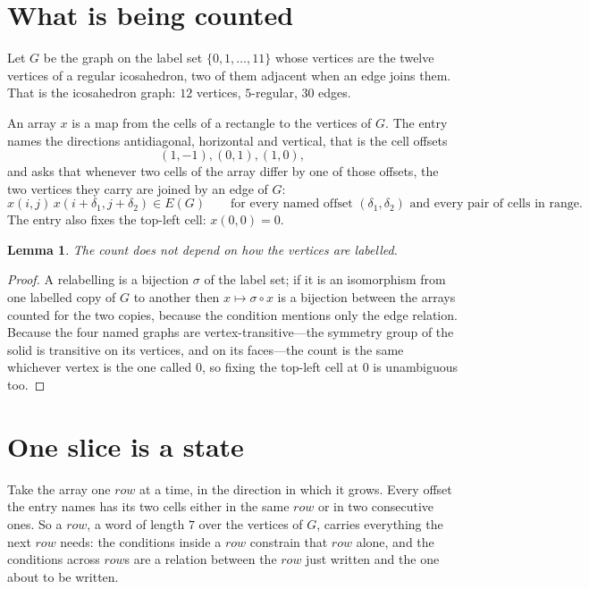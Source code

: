 \documentclass[11pt,a4paper]{article}
\theoremstyle{plain}
\newtheorem{lemma}[theorem]{Lemma}
\theoremstyle{definition}
\begin{document}
\section{What is being counted}

Let $G$ be the graph on the label set $\{0,1,\dots,11\}$ whose vertices are the twelve vertices of a regular icosahedron, two of them adjacent when an edge joins them. That is the icosahedron graph: $12$ vertices, $5$-regular, $30$ edges.

An array $x$ is a map from the cells of a rectangle to the vertices of $G$. The entry names the
directions antidiagonal, horizontal and vertical, that is the cell offsets
\[
(1,-1), (0,1), (1,0),
\]
and asks that whenever two cells of the array differ by one of those offsets, the two vertices
they carry are joined by an edge of $G$:
\[
x(i,j)\,x(i+\delta_1,j+\delta_2)\in E(G)\qquad
\text{for every named offset } (\delta_1,\delta_2)\text{ and every pair of cells in range.}
\]
The entry also fixes the top-left cell: $x(0,0)=0$.

\begin{lemma}\label{lem:label}
The count does not depend on how the vertices are labelled.
\end{lemma}

\begin{proof}
A relabelling is a bijection $\sigma$ of the label set; if it is an isomorphism from one
labelled copy of $G$ to another then $x\mapsto\sigma\circ x$ is a bijection between the arrays
counted for the two copies, because the condition mentions only the edge relation.
Because the four named graphs are vertex-transitive---the symmetry group of the solid is transitive on its vertices, and on its faces---the count is the same whichever vertex is the one called $0$, so fixing the top-left cell at $0$ is unambiguous too.
\end{proof}

\section{One slice is a state}

Take the array one $row$ at a time, in the direction in which it grows.
Every offset the entry names has its two cells either in the same $row$ or in two
consecutive ones. So a $row$, a word of length $7$ over the vertices of $G$, carries
everything the next $row$ needs: the conditions inside a $row$ constrain that
$row$ alone, and the conditions across $row$s are a relation between the
$row$ just written and the one about to be written.
\end{document}

